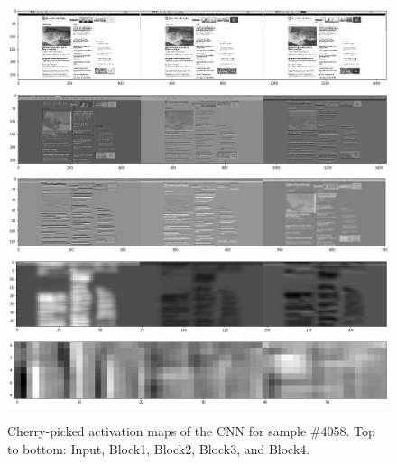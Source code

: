\begin{figure}[ht]
    \centering
    \includegraphics[clip,width=\columnwidth]{resources/analysis/feat-map-4058-0.png}\\
    \includegraphics[clip,width=\columnwidth]{resources/analysis/feat-map-4058-1.png}\\
    \includegraphics[clip,width=\columnwidth]{resources/analysis/feat-map-4058-2.png}\\
    \includegraphics[clip,width=\columnwidth]{resources/analysis/feat-map-4058-3.png}\\
    \includegraphics[clip,width=\columnwidth]{resources/analysis/feat-map-4058-4.png}\\
    \caption[Activation maps of the CNN for sample \#4058]{Cherry-picked activation maps of the CNN for sample \#4058. Top to bottom: Input, Block1, Block2, Block3, and Block4.}
    \label{fig:activationmaps2}
\end{figure}

